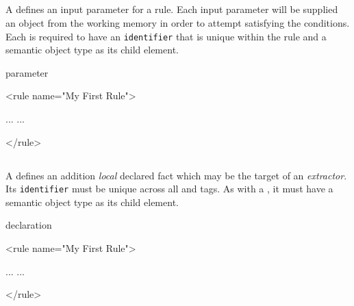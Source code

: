 
\subsection{}

A  defines an input parameter for a rule.  Each input
parameter will be supplied an object from the working memory in order
to attempt satisfying the conditions.  Each  is
required to have an \texttt{identifier} that is unique within the rule and a
semantic object type as its child element.

\begin{tagDesc}{parameter}
\attrs
\tags
\end{tagDesc}

\begin{center}
\begin{minipage}{0.8\textwidth}
\begin{tagExample}
<rule name="My First Rule">

    \color{black}{<parameter identifier="factOne">}
        ...
    \color{black}{</parameter>}
    \color{black}{<parameter identifier="factTwo">}
        ...
    \color{black}{</parameter>}

</rule>
\end{tagExample}
\end{minipage}
\end{center}


\subsection{}

A  defines an addition \emph{local} declared fact
which may be the target of an \emph{extractor}. Its
\texttt{identifier} must be unique across all  and
 tags.  As with a , it must have
a semantic object type as its child element.

\begin{tagDesc}{declaration}
\attrs
\tags
\end{tagDesc}

\begin{center}
\begin{minipage}{0.8\textwidth}
\begin{tagExample}
<rule name="My First Rule">

    \color{black}{<declaration identifier="factOne">}
        ...
    \color{black}{</declaration>}
    \color{black}{<declaration identifier="factTwo">}
        ...
    \color{black}{</declaration>}

</rule>
\end{tagExample}
\end{minipage}
\end{center}

